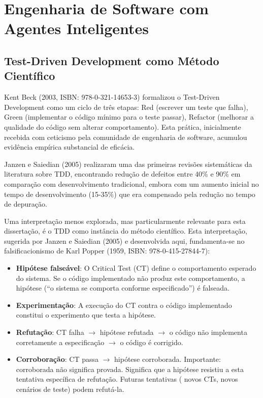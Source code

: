 \section{Engenharia de Software com Agentes Inteligentes}

\subsection{Test-Driven Development como Método Científico}

Kent Beck (2003, ISBN: 978-0-321-14653-3) formalizou o Test-Driven Development como um ciclo de três etapas: Red (escrever um teste que falha), Green (implementar o código mínimo para o teste passar), Refactor (melhorar a qualidade do código sem alterar comportamento). Esta prática, inicialmente recebida com ceticismo pela comunidade de engenharia de software, acumulou evidência empírica substancial de eficácia.

Janzen e Saiedian (2005)  realizaram uma das primeiras revisões sistemáticas da literatura sobre TDD, encontrando redução de defeitos entre 40\% e 90\% em comparação com desenvolvimento tradicional, embora com um aumento inicial no tempo de desenvolvimento (15-35\%) que era compensado pela redução no tempo de depuração.

Uma interpretação menos explorada, mas particularmente relevante para esta dissertação, é o TDD como instância do método científico. Esta interpretação, sugerida por Janzen e Saiedian (2005) e desenvolvida aqui, fundamenta-se no falsificacionismo de Karl Popper (1959, ISBN: 978-0-415-27844-7):

\begin{itemize}
    \item \textbf{Hipótese falseável}: O Critical Test (CT) define o comportamento esperado do sistema. Se o código implementado não produz este comportamento, a hipótese (``o sistema se comporta conforme especificado'') é falseada.
    \item \textbf{Experimentação}: A execução do CT contra o código implementado constitui o experimento que testa a hipótese.
    \item \textbf{Refutação}: CT falha $\rightarrow$ hipótese refutada $\rightarrow$ o código não implementa corretamente a especificação $\rightarrow$ o código é corrigido.
    \item \textbf{Corroboração}: CT passa $\rightarrow$ hipótese corroborada. Importante: corroborada não significa provada. Significa que a hipótese resistiu a esta tentativa específica de refutação. Futuras tentativas ( novos CTs, novos cenários de teste) podem refutá-la.
\end{itemize}

